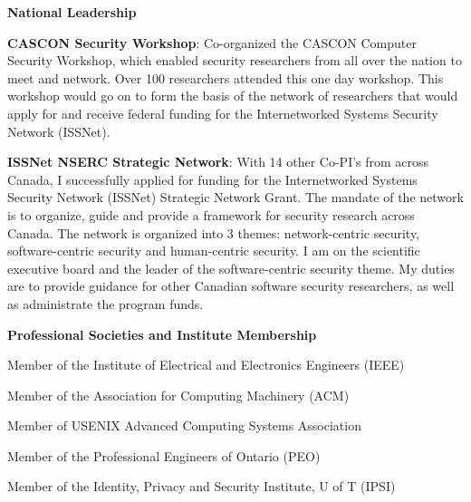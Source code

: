 \documentclass[10pt]{article}
\newenvironment{lonelist}[1][\enskip\textbullet]%
        {\vspace{-\baselineskip}\begin{list}{#1}{%
        \setlength{\partopsep}{0pt}%
        \setlength{\topsep}{0pt}
	\setlength{\leftmargin}{0pt}}}
        {\end{list}\vspace{-.6\baselineskip}}
\newenvironment{innerlist}[1][\enskip\textbullet]%
        {\begin{compactitem}[#1]}{\end{compactitem}}
\begin{document}
\begin{lonelist}
\item[] {\bf National Leadership}
\begin{innerlist}
\item[] {\bf CASCON Security Workshop}: Co-organized the CASCON Computer Security Workshop, which enabled security researchers from all over the nation to meet and network.  Over 100 researchers attended this one day workshop.  This workshop would go on to form the basis of the network of researchers that would apply for and receive federal funding for the Internetworked Systems Security Network (ISSNet).  

\item[] {\bf ISSNet NSERC Strategic Network}: With 14 other Co-PI's
from across Canada, I successfully applied for funding for the
Internetworked Systems Security Network (ISSNet) Strategic Network
Grant.  The mandate of the network is to organize, guide and provide a
framework for security research across Canada.  The network is
organized into 3 themes: network-centric security, software-centric
security and human-centric security.  I am on the scientific executive
board and the leader of the  software-centric security theme.  My duties are to provide
guidance for other Canadian software security researchers, as well as
administrate the program funds.
\end{innerlist}

\item[] {\bf Professional Societies and Institute Membership}
\begin{innerlist}
\item Member of the Institute of Electrical and Electronics Engineers (IEEE)
\item Member of the Association for Computing Machinery (ACM)
\item Member of USENIX Advanced Computing Systems Association
\item Member of the Professional Engineers of Ontario (PEO)
\item Member of the Identity, Privacy and Security Institute, U of T (IPSI)
\end{innerlist}
\end{lonelist}
\end{document}
